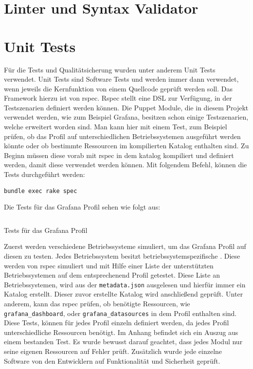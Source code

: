\section{Linter und Syntax Validator}

\section{Unit Tests}
Für die Tests und Qualitätsicherung wurden unter anderem Unit Tests verwendet.
Unit Tests sind Software Tests und werden immer dann verwendet, wenn jeweils
die Kernfunktion von einem Quellcode geprüft werden soll. Das Framework hierzu
ist von rspec. Rspec stellt eine \gls{DSL} zur Verfügung, in der Testszenarien
definiert werden können. Die Puppet Module, die in diesem Projekt verwendet
werden, wie zum Beispiel Grafana, besitzen schon einige Testszenarien, welche
erweitert worden sind. Man kann hier mit einem Test, zum Beispiel prüfen, ob
das Profil auf unterschiedlichen Betriebssystemen ausgeführt werden könnte oder
ob bestimmte Ressourcen im kompilierten Katalog enthalten sind. Zu Beginn
müssen diese vorab mit rspec in dem katalog kompiliert und definiert werden,
damit diese verwendet werden können. Mit folgendem Befehl, können die Tests
durchgeführt werden:
\begin{lstlisting}[language=bash]
bundle exec rake spec
\end{lstlisting}

Die Tests für das Grafana Profil sehen wie folgt aus:

\begin{listing}
  \inputminted{ruby}{../listings/rspec-grafana.txt}
  \caption{Tests für das Grafana Profil}
\end{listing}

Zuerst werden verschiedene Betriebssysteme simuliert, um das Grafana Profil auf
diesen zu testen. Jedes Betriebssystem besitzt betriebssystemspezifische
. Diese werden von rspec simuliert und mit Hilfe einer
Liste der unterstützten Betriebssystemen auf dem entsprechenend Profil
getestet. Diese Liste an Betriebssystemen, wird aus der \texttt{metadata.json}
ausgelesen und hierfür immer ein Katalog erstellt. Dieser zuvor erstellte
Katalog wird anschließend geprüft. Unter anderem, kann das rspec prüfen, ob
benötigte Ressourcen, wie \texttt{grafana\_dashboard}, oder
\texttt{grafana\_datasources} in dem Profil enthalten sind. Diese Tests, können
für jedes Profil einzeln definiert werden, da jedes Profil unterschiedliche
Ressourcen benötigt. Im Anhang befindet sich ein Auszug aus einem bestanden
Test. Es wurde bewusst darauf geachtet, dass jedes Modul nur seine eigenen
Ressourcen auf Fehler prüft. Zusätzlich wurde jede einzelne Software
von den Entwicklern auf Funktionalität und Sicherheit geprüft.

